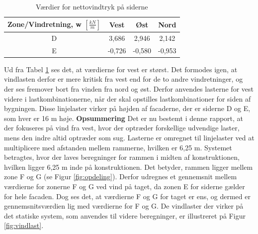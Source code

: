 \begin{table}[htb]
	\begin{center}
		\begin{tabular}{|c|c|c|c|}
			\hline
			Zone/Vindretning, w $[\frac{kN}{m}]$ & Vest & Øst & Nord \\ \hline
			D & 3,686 & 2,946 & 2,142 \\ \hline
			E & -0,726 & -0,580 & -0,953 \\ \hline
		\end{tabular}
		\caption{Værdier for nettovindtryk på siderne}
		\label{tab:hh}
	\end{center}
\end{table}

Ud fra Tabel \ref{tab:hh} ses det, at værdierne for vest er størst. Det formodes igen, at vindlasten derfor er mere kritisk fra vest end for de to andre vindretninger, og der ses fremover bort fra vinden fra nord og øst. Derfor anvendes lasterne for vest videre i lastkombinationerne, når der skal opstilles lastkombinationer for siden af bygningen.
\newline \indent{     }  Disse linjelaster virker på højden af facaderne, der er siderne D og E, som hver er 16 m høje.
\newline
\newline
\textbf{Opsummering}
\newline
Det er nu bestemt i denne rapport, at der fokuseres på vind fra vest, hvor der optræder forskellige udvendige laster, mens den indre altid optræder som sug. Lasterne er omregnet til linjelaster ved at multiplicere med afstanden mellem rammerne, hvilken er 6,25 m. 
\newline
\newline
Systemet betragtes, hvor der laves beregninger for rammen i midten af konstruktionen, hvilken ligger 6,25 m inde på konstruktionen. Det betyder, rammen ligger mellem zone F og G (se Figur \ref{fig:opdeling}). Derfor udregnes et gennemsnit mellem værdierne for zonerne F og G ved vind på taget, da zonen E for siderne gælder for hele facaden. 
Dog ses det, at værdierne F og G for taget er ens, og dermed er gennemsnitsværdien lig med værdierne for F og G. 
\newline \indent{     }  De vindlaster der virker på det statiske system, som anvendes til videre beregninger, er illustreret på Figur \ref{fig:vindlast}. 

